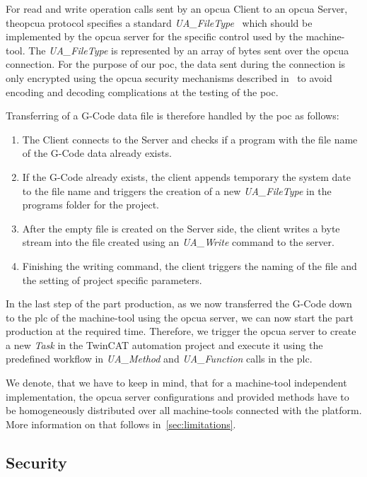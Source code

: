 \documentclass[
a4paper,
twoside,
headsepline,
cleardoublepage=empty,
parskip=half,
draft=false
]{scrbook}
\begin{document}
				For read and write operation calls sent by an \gls{opcua} Client to an \gls{opcua} Server, the\gls{opcua} protocol specifies a standard \textit{UA\_FileType}~\cite{opcfoundation2017part5} which should be implemented by the \gls{opcua} server for the specific control used by the machine-tool. The \textit{UA\_FileType} is represented by an array of bytes sent over the \gls{opcua} connection. For the purpose of our \gls{poc}, the data sent during the connection is only encrypted using the \gls{opcua} security mechanisms described in~\cite{opcfoundation2017part1} to avoid encoding and decoding complications at the testing of the \gls{poc}.
				
				Transferring of a G-Code data file is therefore handled by the \gls{poc} as follows:

				\begin{enumerate}
					\item The Client connects to the Server and checks if a program with the file name of the G-Code data already exists.
					\item If the G-Code already exists, the client appends temporary the system date to the file name and triggers the creation of a new \textit{UA\_FileType} in the programs folder for the project.
					\item After the empty file is created on the Server side, the client writes a byte stream into the file created using an \textit{UA\_Write} command to the server.
					\item Finishing the writing command, the client triggers the naming of the file and the setting of project specific parameters.
				\end{enumerate}

				In the last step of the part production, as we now transferred the G-Code down to the \gls{plc} of the machine-tool using the \gls{opcua} server, we can now start the part production at the required time. Therefore, we trigger the \gls{opcua} server to create a new \textit{Task} in the TwinCAT automation project and execute it using the predefined workflow in \textit{UA\_Method} and \textit{UA\_Function} calls in the \gls{plc}.

				We denote, that we have to keep in mind, that for a machine-tool independent implementation, the \gls{opcua} server configurations and provided methods have to be homogeneously distributed over all machine-tools connected with the platform. More information on that follows in~\cref{sec:limitations}.

			\subsection{Security} \label{subsec:security}
\end{document}

